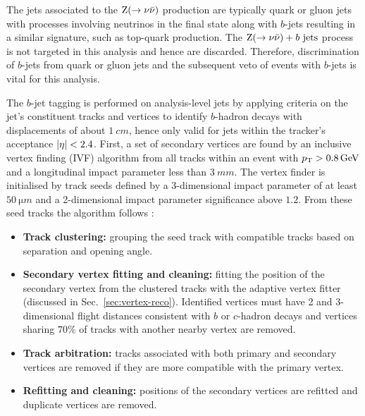 The jets associated to the ${\mathrm{Z}(\rightarrow\nu\bar{\nu})}$ production are typically quark or gluon jets with processes involving neutrinos in the final state along with $b$-jets resulting in a similar signature, such as top-quark production. The ${\PZ(\ra\nu\bar{\nu})+b\ \mathrm{jets}}$ process is not targeted in this analysis and hence are discarded. Therefore, discrimination of $b$-jets from quark or gluon jets and the subsequent veto of events with $b$-jets is vital for this analysis.

The $b$-jet tagging is performed on analysis-level jets by applying criteria on the jet's constituent tracks and vertices to identify $b$-hadron decays with displacements of about $\SI{1}{cm}$, hence only valid for jets within the tracker's acceptance ${|\eta|<2.4}$. First, a set of secondary vertices are found by an inclusive vertex finding (IVF) algorithm from all tracks within an event with ${p_{\text{T}}>\SI{0.8}{GeV}}$ and a longitudinal impact parameter less than ${\SI{3}{mm}}$. The vertex finder is initialised by track seeds defined by a 3-dimensional impact parameter of at least ${\SI{50}{\micro m}}$ and a 2-dimensional impact parameter significance above $1.2$. From these seed tracks the algorithm follows \cite{Sirunyan:2017ezt}:
\begin{itemize}
    \item \textbf{Track clustering:} grouping the seed track with compatible tracks based on separation and opening angle.
    \item \textbf{Secondary vertex fitting and cleaning:} fitting the position of the secondary vertex from the clustered tracks with the adaptive vertex fitter (discussed in Sec.~\ref{sec:vertex-reco}). Identified vertices must have 2 and 3-dimensional flight distances consistent with $b$ or $c$-hadron decays and vertices sharing $70\%$ of tracks with another nearby vertex are removed.
    \item \textbf{Track arbitration:} tracks associated with both primary and secondary vertices are removed if they are more compatible with the primary vertex.
    \item \textbf{Refitting and cleaning:} positions of the secondary vertices are refitted and duplicate vertices are removed.
\end{itemize}
